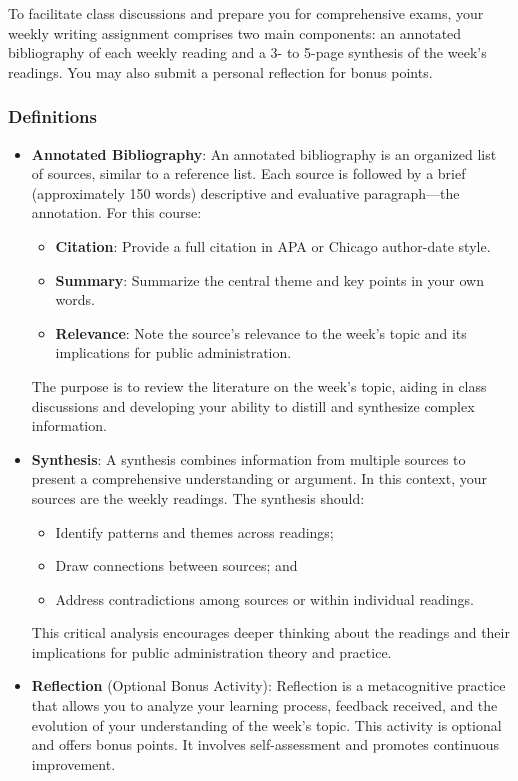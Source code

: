 \documentclass[12pt, letterpaper]{article}
\begin{document}
To facilitate class discussions and prepare you for comprehensive exams, your weekly writing assignment comprises two main components: an annotated bibliography of each weekly reading and a 3- to 5-page synthesis of the week's readings. You may also submit a personal reflection for bonus points. 

\subsubsection*{Definitions}
\begin{itemize}
\item \textbf{Annotated Bibliography}: An annotated bibliography is an organized list of sources, similar to a reference list. Each source is followed by a brief (approximately 150 words) descriptive and evaluative paragraph—the annotation. For this course:

\begin{itemize}
    \item \textbf{Citation}: Provide a full citation in APA or Chicago author-date style.
    \item \textbf{Summary}: Summarize the central theme and key points in your own words.
    \item \textbf{Relevance}: Note the source's relevance to the week's topic and its implications for public administration.
\end{itemize}

\noindent The purpose is to review the literature on the week's topic, aiding in class discussions and developing your ability to distill and synthesize complex information.

\item \textbf{Synthesis}: A synthesis combines information from multiple sources to present a comprehensive understanding or argument. In this context, your sources are the weekly readings. The synthesis should:

\begin{itemize}
    \item Identify patterns and themes across readings;
    \item Draw connections between sources; and
    \item Address contradictions among sources or within individual readings.
\end{itemize}

\noindent This critical analysis encourages deeper thinking about the readings and their implications for public administration theory and practice.

\item \textbf{Reflection} (Optional Bonus Activity): Reflection is a metacognitive practice that allows you to analyze your learning process, feedback received, and the evolution of your understanding of the week's topic. This activity is optional and offers bonus points. It involves self-assessment and promotes continuous improvement.

\end{itemize}
\end{document}
